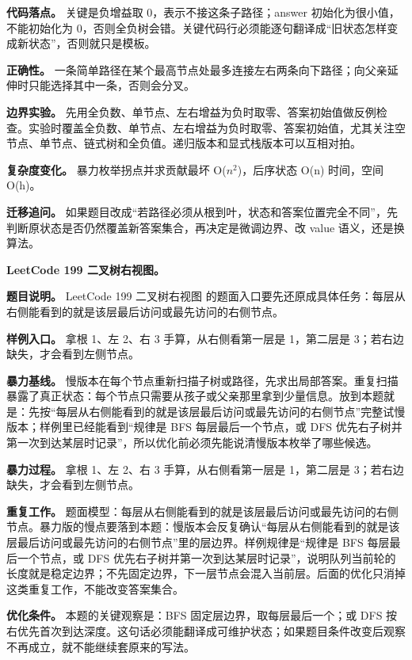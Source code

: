 \textbf{代码落点。} 关键是负增益取 0，表示不接这条子路径；answer 初始化为很小值，不能初始化为 0，否则全负树会错。关键代码行必须能逐句翻译成“旧状态怎样变成新状态”，否则就只是模板。

\textbf{正确性。} 一条简单路径在某个最高节点处最多连接左右两条向下路径；向父亲延伸时只能选择其中一条，否则会分叉。

\textbf{边界实验。} 先用全负数、单节点、左右增益为负时取零、答案初始值做反例检查。实验时覆盖全负数、单节点、左右增益为负时取零、答案初始值，尤其关注空节点、单节点、链式树和全负值。递归版本和显式栈版本可以互相对拍。

\textbf{复杂度变化。} 暴力枚举拐点并求贡献最坏 O(\ensuremath{n^{2}})，后序状态 O(n) 时间，空间 O(h)。

\textbf{迁移追问。} 如果题目改成“若路径必须从根到叶，状态和答案位置完全不同”，先判断原状态是否仍然覆盖新答案集合，再决定是微调边界、改 value 语义，还是换算法。

\noindent\textbf{LeetCode 199 二叉树右视图。}

\textbf{题目说明。} LeetCode 199 二叉树右视图 的题面入口要先还原成具体任务：每层从右侧能看到的就是该层最后访问或最先访问的右侧节点。

\textbf{样例入口。} 拿根 1、左 2、右 3 手算，从右侧看第一层是 1，第二层是 3；若右边缺失，才会看到左侧节点。

\textbf{暴力基线。} 慢版本在每个节点重新扫描子树或路径，先求出局部答案。重复扫描暴露了真正状态：每个节点只需要从孩子或父亲那里拿到少量信息。放到本题就是：先按“每层从右侧能看到的就是该层最后访问或最先访问的右侧节点”完整试慢版本；样例里已经能看到“规律是 BFS 每层最后一个节点，或 DFS 优先右子树并第一次到达某层时记录”，所以优化前必须先能说清慢版本枚举了哪些候选。

\textbf{暴力过程。} 拿根 1、左 2、右 3 手算，从右侧看第一层是 1，第二层是 3；若右边缺失，才会看到左侧节点。

\textbf{重复工作。} 题面模型：每层从右侧能看到的就是该层最后访问或最先访问的右侧节点。暴力版的慢点要落到本题：慢版本会反复确认“每层从右侧能看到的就是该层最后访问或最先访问的右侧节点”里的层边界。样例规律是“规律是 BFS 每层最后一个节点，或 DFS 优先右子树并第一次到达某层时记录”，说明队列当前轮的长度就是稳定边界；不先固定边界，下一层节点会混入当前层。后面的优化只消掉这类重复工作，不能改变答案集合。

\textbf{优化条件。} 本题的关键观察是：BFS 固定层边界，取每层最后一个；或 DFS 按右优先首次到达深度。这句话必须能翻译成可维护状态；如果题目条件改变后观察不再成立，就不能继续套原来的写法。

